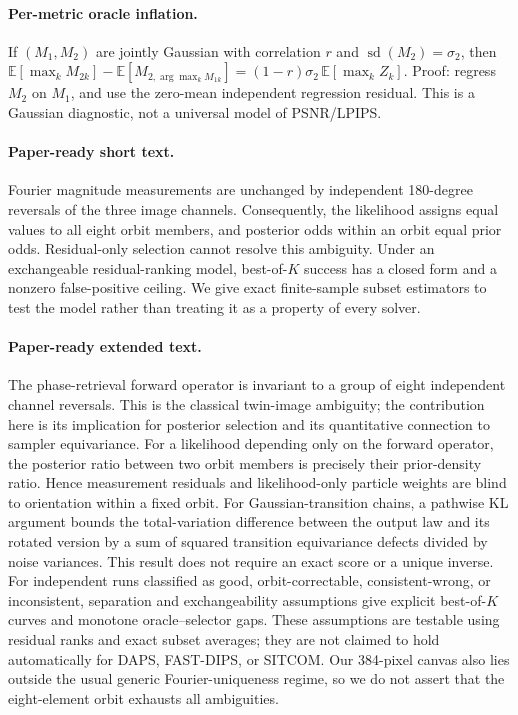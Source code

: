 \documentclass[11pt]{article}
\begin{document}
\paragraph{Per-metric oracle inflation.} If $(M_1,M_2)$ are jointly Gaussian with correlation $r$ and $\operatorname{sd}(M_2)=\sigma_2$, then
$\mathbb E[\max_kM_{2k}]-\mathbb E[M_{2,\arg\max_k M_{1k}}]=(1-r)\sigma_2\,\mathbb E[\max_kZ_k]$.
Proof: regress $M_2$ on $M_1$, and use the zero-mean independent regression residual. This is a Gaussian diagnostic, not a universal model of PSNR/LPIPS.
\paragraph{Paper-ready short text.} Fourier magnitude measurements are unchanged by independent 180-degree reversals of the three image channels. Consequently, the likelihood assigns equal values to all eight orbit members, and posterior odds within an orbit equal prior odds. Residual-only selection cannot resolve this ambiguity. Under an exchangeable residual-ranking model, best-of-$K$ success has a closed form and a nonzero false-positive ceiling. We give exact finite-sample subset estimators to test the model rather than treating it as a property of every solver.
\paragraph{Paper-ready extended text.} The phase-retrieval forward operator is invariant to a group of eight independent channel reversals. This is the classical twin-image ambiguity; the contribution here is its implication for posterior selection and its quantitative connection to sampler equivariance. For a likelihood depending only on the forward operator, the posterior ratio between two orbit members is precisely their prior-density ratio. Hence measurement residuals and likelihood-only particle weights are blind to orientation within a fixed orbit. For Gaussian-transition chains, a pathwise KL argument bounds the total-variation difference between the output law and its rotated version by a sum of squared transition equivariance defects divided by noise variances. This result does not require an exact score or a unique inverse. For independent runs classified as good, orbit-correctable, consistent-wrong, or inconsistent, separation and exchangeability assumptions give explicit best-of-$K$ curves and monotone oracle--selector gaps. These assumptions are testable using residual ranks and exact subset averages; they are not claimed to hold automatically for DAPS, FAST-DIPS, or SITCOM. Our 384-pixel canvas also lies outside the usual generic Fourier-uniqueness regime, so we do not assert that the eight-element orbit exhausts all ambiguities.
\end{document}
